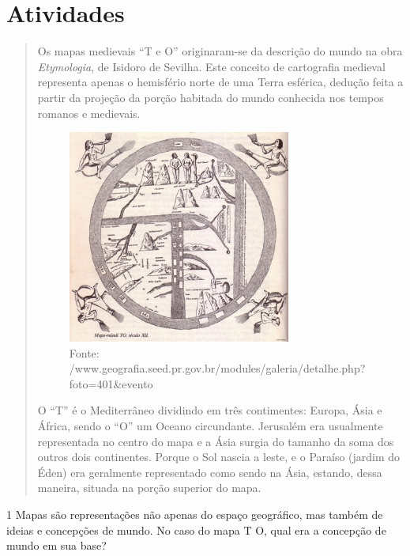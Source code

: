 \section{Atividades}

\begin{quote}
Os mapas medievais ``T e O'' originaram-se da descrição do mundo na
obra \emph{Etymologia}, de Isidoro de Sevilha. Este conceito de
cartografia medieval representa apenas o hemisfério norte de uma Terra
esférica, dedução feita a partir da projeção da porção habitada do mundo
conhecida nos tempos romanos e medievais.

\begin{figure}[htpb!]
\includegraphics[width=2.88577in,height=2.76032in]{./imgs/img1.jpg}
\caption{Fonte: /www.geografia.seed.pr.gov.br/modules/galeria/detalhe.php?foto=401\&evento}
\end{figure}

O ``T'' é o Mediterrâneo
dividindo em três contimentes: Europa, Ásia e África, sendo o ``O'' um
Oceano circundante. Jerusalém era usualmente representada no centro do
mapa e a Ásia surgia do tamanho da soma dos outros dois continentes.
Porque o Sol nascia a leste, e o Paraíso (jardim do Éden) era geralmente
representado como sendo na Ásia, estando, dessa maneira, situada na
porção superior do mapa.

\end{quote}

\num{1} Mapas são representações não apenas do espaço geográfico, mas também
de ideias e concepções de mundo. No caso do mapa T O, qual era a
concepção de mundo em sua base?



